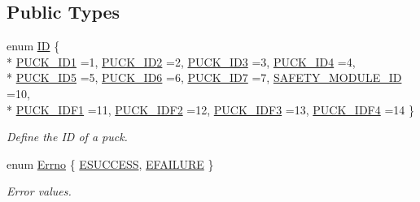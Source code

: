 \subsection*{Public Types}
\begin{DoxyCompactItemize}
\item 
enum \hyperlink{classosa_puck_aa484456bae759574accdc76fe68b4685}{I\+D} \{ \\*
\hyperlink{classosa_puck_aa484456bae759574accdc76fe68b4685a8f6224a7cf8c82077418223f0f635fbe}{P\+U\+C\+K\+\_\+\+I\+D1} =1, 
\hyperlink{classosa_puck_aa484456bae759574accdc76fe68b4685a725a6e6cc48834d9aad9d0e43ffbabc4}{P\+U\+C\+K\+\_\+\+I\+D2} =2, 
\hyperlink{classosa_puck_aa484456bae759574accdc76fe68b4685a0e01adbd2835c2bd1fb1d7395593a077}{P\+U\+C\+K\+\_\+\+I\+D3} =3, 
\hyperlink{classosa_puck_aa484456bae759574accdc76fe68b4685aed38def6a79f0b5627e3ba55d5eddc88}{P\+U\+C\+K\+\_\+\+I\+D4} =4, 
\\*
\hyperlink{classosa_puck_aa484456bae759574accdc76fe68b4685a9d7b99532e56f84db4fdea36c5825e88}{P\+U\+C\+K\+\_\+\+I\+D5} =5, 
\hyperlink{classosa_puck_aa484456bae759574accdc76fe68b4685adcc929e6040bbb5156ef09189361219e}{P\+U\+C\+K\+\_\+\+I\+D6} =6, 
\hyperlink{classosa_puck_aa484456bae759574accdc76fe68b4685acedb32b36ebd2c1b8eb19c6a9d511c61}{P\+U\+C\+K\+\_\+\+I\+D7} =7, 
\hyperlink{classosa_puck_aa484456bae759574accdc76fe68b4685aab1b8f9724a4be829e5cedf6307e733d}{S\+A\+F\+E\+T\+Y\+\_\+\+M\+O\+D\+U\+L\+E\+\_\+\+I\+D} =10, 
\\*
\hyperlink{classosa_puck_aa484456bae759574accdc76fe68b4685a74fa07d4ee93388f1cac5a6ea07bc13e}{P\+U\+C\+K\+\_\+\+I\+D\+F1} =11, 
\hyperlink{classosa_puck_aa484456bae759574accdc76fe68b4685aea968db3dd8a9bfde1940beff8b17626}{P\+U\+C\+K\+\_\+\+I\+D\+F2} =12, 
\hyperlink{classosa_puck_aa484456bae759574accdc76fe68b4685a3ae0bcf36626f7e051f07788baed4d6a}{P\+U\+C\+K\+\_\+\+I\+D\+F3} =13, 
\hyperlink{classosa_puck_aa484456bae759574accdc76fe68b4685a091148321429c37e4f3e7446d2797c03}{P\+U\+C\+K\+\_\+\+I\+D\+F4} =14
 \}
\begin{DoxyCompactList}\small\item\em Define the I\+D of a puck. \end{DoxyCompactList}\item 
enum \hyperlink{classosa_puck_af19c88d20083577d3a676353b4902391}{Errno} \{ \hyperlink{classosa_puck_af19c88d20083577d3a676353b4902391ade248d33c01e1fb3444c3aa6d9e6c1ae}{E\+S\+U\+C\+C\+E\+S\+S}, 
\hyperlink{classosa_puck_af19c88d20083577d3a676353b4902391a5aff629d7cc5592d2c7a94b756f6a741}{E\+F\+A\+I\+L\+U\+R\+E}
 \}
\begin{DoxyCompactList}\small\item\em Error values. \end{DoxyCompactList}\end{DoxyCompactItemize}
